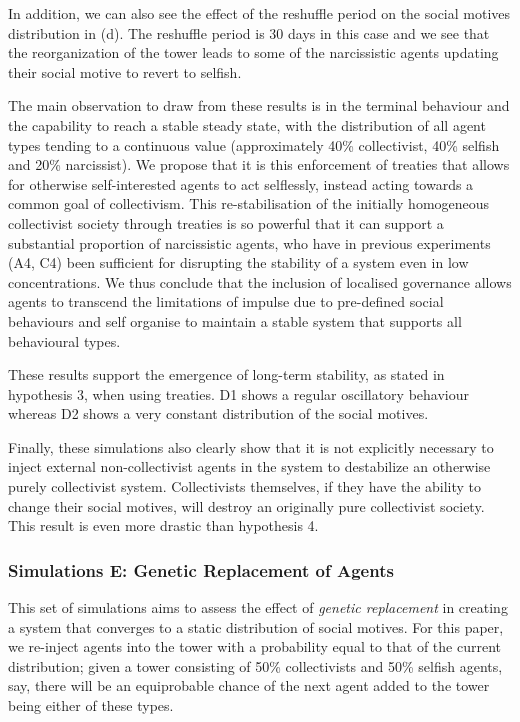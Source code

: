 In addition, we can also see the effect of the reshuffle period on the social motives distribution in  (d). The reshuffle period is 30 days in this case and we see that the reorganization of the tower leads to some of the narcissistic agents updating their social motive to revert to selfish.

The main observation to draw from these results is in the terminal behaviour and the capability to reach a stable steady state, with the distribution of all agent types tending to a continuous value (approximately 40\% collectivist, 40\% selfish and 20\% narcissist). We propose that it is this enforcement of treaties that allows for otherwise self-interested agents to act selflessly, instead acting towards a common goal of collectivism. This re-stabilisation of the initially homogeneous collectivist society through treaties is so powerful that it can support a substantial proportion of narcissistic agents, who have in previous experiments (A4, C4) been sufficient for disrupting the stability of a system even in low concentrations. We thus conclude that the inclusion of localised governance allows agents to transcend the limitations of impulse due to pre-defined social behaviours and self organise to maintain a stable system that supports all behavioural types.

These results support the emergence of long-term stability, as stated in hypothesis 3, when using treaties. D1 shows a regular oscillatory behaviour whereas D2 shows a very constant distribution of the social motives.

Finally, these simulations also clearly show that it is not explicitly necessary to inject external non-collectivist agents in the system to destabilize an otherwise purely collectivist system. Collectivists themselves, if they have the ability to change their social motives, will destroy an originally pure collectivist society. This result is even more drastic than hypothesis 4.


\subsubsection{Simulations E: Genetic Replacement of Agents}

This set of simulations aims to assess the effect of \textit{genetic replacement} \cite{vacher1998genetic} \cite{froese2003steps} in creating a system that converges to a static distribution of social motives. For this paper, we re-inject agents into the tower with a probability equal to that of the current distribution; given a tower consisting of 50\% collectivists and 50\% selfish agents, say, there will be an equiprobable chance of the next agent added to the tower being either of these types.

